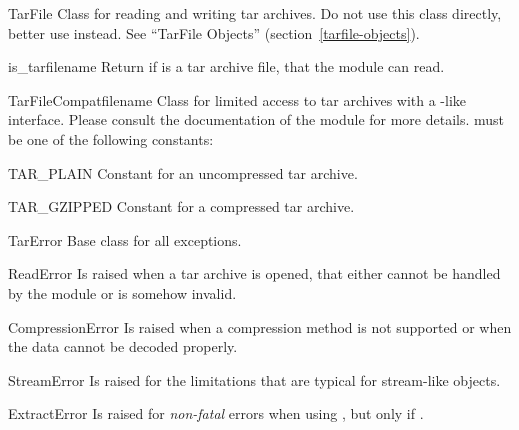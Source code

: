 \begin{classdesc*}{TarFile}
    Class for reading and writing tar archives. Do not use this
    class directly, better use  instead.
    See ``TarFile Objects'' (section~\ref{tarfile-objects}).
\end{classdesc*}

\begin{funcdesc}{is_tarfile}{name}
    Return  if  is a tar archive file, that
    the  module can read.
\end{funcdesc}

\begin{classdesc}{TarFileCompat}{filename}
    Class for limited access to tar archives with a
    -like interface. Please consult the
    documentation of the  module for more details.
     must be one of the following constants:
    \begin{datadesc}{TAR_PLAIN}
        Constant for an uncompressed tar archive.
    \end{datadesc}
    \begin{datadesc}{TAR_GZIPPED}
        Constant for a  compressed tar archive.
    \end{datadesc}
\end{classdesc}

\begin{excdesc}{TarError}
    Base class for all  exceptions.
\end{excdesc}

\begin{excdesc}{ReadError}
    Is raised when a tar archive is opened, that either cannot be handled by
    the  module or is somehow invalid.
\end{excdesc}

\begin{excdesc}{CompressionError}
    Is raised when a compression method is not supported or when the data
    cannot be decoded properly.
\end{excdesc}

\begin{excdesc}{StreamError}
    Is raised for the limitations that are typical for stream-like
     objects.
\end{excdesc}

\begin{excdesc}{ExtractError}
    Is raised for \emph{non-fatal} errors when using , but
    only if .
\end{excdesc}


